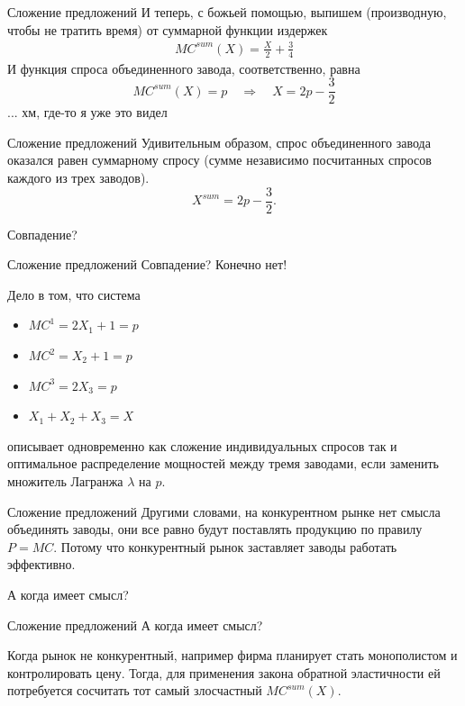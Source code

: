 \documentclass{beamer}
\begin{document}
\begin{frame}{Сложение предложений}
И теперь, с божьей помощью, выпишем (производную, чтобы не тратить время) от суммарной функции издержек
\begin{gather*}MC^{sum}(X) = \frac{X}{2} + \frac{3}{4}\end{gather*}
И функция спроса объединенного завода, соответственно, равна $$MC^{sum}(X) = p \quad \Rightarrow \quad X = 2p - \frac{3}{2}$$
... хм, где-то я уже это видел
\end{frame}

\begin{frame}{Сложение предложений}
Удивительным образом, спрос объединенного завода оказался равен суммарному спросу (сумме независимо посчитанных спросов каждого из трех заводов).
$$X^{sum} = 2p - \frac{3}{2}.$$

Совпадение?
\end{frame}

\begin{frame}{Сложение предложений}
Совпадение? Конечно нет!

Дело в том, что система
\begin{itemize}
  \item $MC^1 = 2 X_1 + 1 = p$
  \item $MC^2 = X_2 + 1 = p$
  \item $MC^3 = 2 X_3 = p$
  \item $X_1 + X_2 + X_3 = X$
\end{itemize}
описывает одновременно как сложение индивидуальных спросов так и оптимальное распределение мощностей между тремя заводами, если заменить множитель Лагранжа $\lambda$ на $p$.
\end{frame}

\begin{frame}{Сложение предложений}
Другими словами, на конкурентном рынке нет смысла объединять заводы, они все равно будут поставлять продукцию по правилу $P=MC$. Потому что конкурентный рынок заставляет заводы работать эффективно.

А когда имеет смысл?
\end{frame}

\begin{frame}{Сложение предложений}
А когда имеет смысл? 

Когда рынок не конкурентный, например фирма планирует стать монополистом и контролировать цену. Тогда, для применения закона обратной эластичности ей потребуется сосчитать тот самый злосчастный $MC^{sum}(X)$.
\end{frame}
\end{document}
